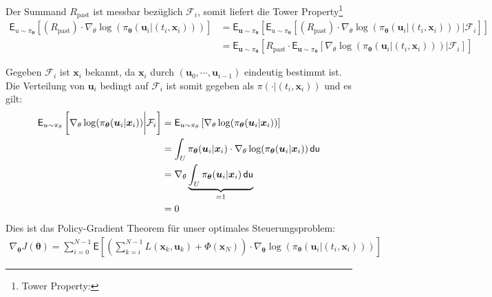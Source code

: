 \documentclass[a4paper, 12pt]{scrartcl}
\newcommand{\du}{\thinspace \mathsf{du}}
\begin{document}
Der Summand $R_{\text{past}}$ ist messbar bezüglich $\mathcal{F}_i$, somit liefert
die Tower Property\footnote{
    Tower Property:
}
\begin{align*}
    \mathsf{E}_{u \sim \pi_{\bm{\theta}}}
    \left[
        \left(
            R_{\text{past}}
        \right)
        \cdot 
        \nabla_{\theta} \log(\pi_{\bm{\theta}}(\bm{u}_i | (t_i, \bm{x}_i)))
    \right]
    &=
    \mathsf{E}_{\bm{u} \sim \pi_{\bm{\theta}}}
    \left[
        \mathsf{E}_{u \sim \pi_{\bm{\theta}}}
        \left[
            \left(
                R_{\text{past}}
            \right)
            \cdot 
            \nabla_{\theta} \log(\pi_{\bm{\theta}}(\bm{u}_i | (t_i, \bm{x}_i)))
            \bigg|
            \mathcal{F}_{i}
        \right]
    \right]
    \\
    &=
    \mathsf{E}_{\bm{u} \sim \pi_{\bm{\theta}}}
    \left[
        R_{\text{past}}
        \cdot 
        \mathsf{E}_{\bm{u} \sim \pi_{\bm{\theta}}}
        \left[
            \nabla_{\theta} \log(\pi_{\bm{\theta}}(\bm{u}_i | (t_i, \bm{x}_i)))
            \bigg|
            \mathcal{F}_{i}
        \right]
    \right]
\end{align*}

Gegeben $\mathcal{F}_i$ ist $\bm{x}_i$ bekannt, da 
$\bm{x}_i$ durch $(\bm{u}_0, \cdots , \bm{u}_{i-1})$ eindeutig bestimmt ist. 
Die Verteilung von $\bm{u}_i$ bedingt auf $\mathcal{F}_i$ ist somit gegeben als 
$\pi(\cdot | (t_i, \bm{x}_i))$ und es gilt:
%
\begin{align*}
    \mathsf{E}_{u \sim \pi_{\theta}}
    \left[
        \nabla_{\theta} \log(\pi_{\bm{\theta}}(\bm{u}_i | \bm{x}_i))
        \bigg|
        \mathcal{F}_{i}
    \right]
    &=
    \mathsf{E}_{u \sim \pi_{\theta}}
    \left[
        \nabla_{\theta} \log(\pi_{\bm{\theta}}(\bm{u}_i | \bm{x}_i))
    \right]
    \\
    &=
    \int_U
    \pi_{\bm{\theta}}(\bm{u}_i | \bm{x}_i)
    \cdot
    \nabla_{\theta} \log(\pi_{\bm{\theta}}(\bm{u}_i | \bm{x}_i))
    \du
    \\
    &=
    \nabla_{\theta} 
    \underbrace{
        \int_U
        \pi_{\bm{\theta}}(\bm{u}_i | \bm{x}_i)
        \du
    }_{= 1}
    \\
    &=
    0
\end{align*}
%
Dies ist das Policy-Gradient Theorem für unser optimales Steuerungsproblem:
%
\begin{align}
    \nabla_{\bm{\theta}} J(\bm{\theta}) 
    =
    \sum_{i=0}^{N-1}
    \mathsf{E}
    \left[
        \left(
            \sum_{k=i}^{N-1}
            L(\bm{x}_k, \bm{u}_k)
            +
            \Phi(\bm{x}_N)
        \right)
        \cdot 
        \nabla_{\bm{\theta}} 
        \log(\pi_{\bm{\theta}}(\bm{u}_i | (t_i,\bm{x}_i)))
    \right]
    \label{eq:Policy_Gradient_Theorem}
\end{align}
\end{document}
